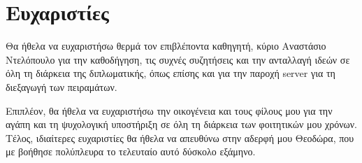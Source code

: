 \pagestyle{plain}
\chapter*{Ευχαριστίες}
Θα ήθελα να ευχαριστήσω θερμά τον επιβλέποντα καθηγητή, κύριο Αναστάσιο Ντελόπουλο  για την καθοδήγηση, τις συχνές συζητήσεις και την ανταλλαγή ιδεών σε όλη τη διάρκεια της διπλωματικής, όπως επίσης και για την παροχή server για τη διεξαγωγή των πειραμάτων.

Επιπλέον, θα ήθελα να ευχαριστήσω την οικογένεια και τους  φίλους μου για την αγάπη και τη ψυχολογική υποστήριξη σε όλη τη διάρκεια των φοιτητικών μου χρόνων. Τέλος, ιδιαίτερες ευχαριστίες θα ήθελα να απευθύνω στην αδερφή μου Θεοδώρα, που με βοήθησε πολύπλευρα το τελευταίο αυτό δύσκολο εξάμηνο.

